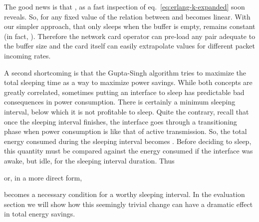 \documentclass[conference,english]{IEEEtran}
\begin{document}
The good news is that , as a fast inspection of eq.~\eqref{eq:erlang-k-expanded}
soon reveals. So, for any fixed value of  the relation between
 and  becomes linear. With our simpler approach, that
only sleeps when the buffer is empty,  remains constant (in fact, ).
Therefore the network card operator can pre-load any pair  adequate to the buffer size and the card itself can easily
extrapolate values for different packet incoming rates.

A second shortcoming is that the Gupta-Singh algorithm tries to maximize the
total sleeping time as a way to maximize power savings. While both concepts
are greatly correlated, sometimes putting an interface to sleep has
predictable bad consequences in power consumption. There is certainly a
minimum sleeping interval, below which it is not profitable to sleep. Quite
the contrary, recall that once the sleeping interval finishes, the interface
goes through a transitioning phase when power consumption is like that of
active transmission. So, the total energy consumed during the sleeping
interval becomes . Before deciding to sleep, this quantity must be compared
against the energy consumed if the interface was awake, but idle, for the
sleeping interval duration. Thus

or, in a more direct form,

becomes a necessary condition for a worthy sleeping interval. In the
evaluation section we will show how this seemingly trivial change can have a
dramatic effect in total energy savings.
\end{document}
